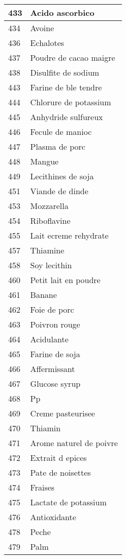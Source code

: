 \begin{longtable}{|l|l|}
433 & Acido ascorbico \\ \hline 
434 & Avoine \\ \hline 
436 & Echalotes \\ \hline 
437 & Poudre de cacao maigre \\ \hline 
438 & Disulfite de sodium \\ \hline 
443 & Farine de ble tendre \\ \hline 
444 & Chlorure de potassium \\ \hline 
445 & Anhydride sulfureux \\ \hline 
446 & Fecule de manioc \\ \hline 
447 & Plasma de porc \\ \hline 
448 & Mangue \\ \hline 
449 & Lecithines de soja \\ \hline 
451 & Viande de dinde \\ \hline 
453 & Mozzarella \\ \hline 
454 & Riboflavine \\ \hline 
455 & Lait ecreme rehydrate \\ \hline 
457 & Thiamine \\ \hline 
458 & Soy lecithin \\ \hline 
460 & Petit lait en poudre \\ \hline 
461 & Banane \\ \hline 
462 & Foie de porc \\ \hline 
463 & Poivron rouge \\ \hline 
464 & Acidulante \\ \hline 
465 & Farine de soja \\ \hline 
466 & Affermissant \\ \hline 
467 & Glucose syrup \\ \hline 
468 & Pp \\ \hline 
469 & Creme pasteurisee \\ \hline 
470 & Thiamin \\ \hline 
471 & Arome naturel de poivre \\ \hline 
472 & Extrait d epices \\ \hline 
473 & Pate de noisettes \\ \hline 
474 & Fraises \\ \hline 
475 & Lactate de potassium \\ \hline 
476 & Antioxidante \\ \hline 
478 & Peche \\ \hline 
479 & Palm \\ \hline 

\end{longtable}
